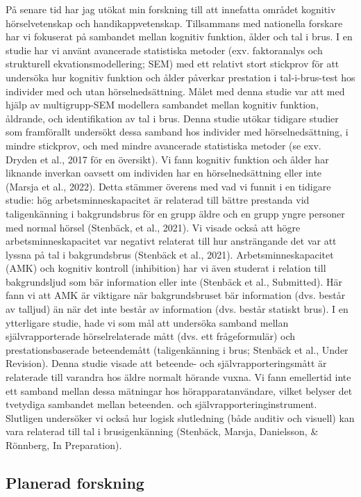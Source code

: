 \documentclass[]{article}
\begin{document}
På senare tid har jag utökat min forskning till att innefatta området
kognitiv hörselvetenskap och handikappvetenskap. Tillsammans med
nationella forskare har vi fokuserat på sambandet mellan kognitiv
funktion, ålder och tal i brus. I en studie har vi använt avancerade
statistiska metoder (exv. faktoranalys och strukturell
ekvationsmodellering; SEM) med ett relativt stort stickprov för att
undersöka hur kognitiv funktion och ålder påverkar prestation i
tal-i-brus-test hos individer med och utan hörselnedsättning. Målet med
denna studie var att med hjälp av multigrupp-SEM modellera sambandet
mellan kognitiv funktion, åldrande, och identifikation av tal i brus.
Denna studie utökar tidigare studier som framförallt undersökt dessa
samband hos individer med hörselnedsättning, i mindre stickprov, och med
mindre avancerade statistiska metoder (se exv. Dryden et al., 2017 för
en översikt). Vi fann kognitiv funktion och ålder har liknande inverkan
oavsett om individen har en hörselnedsättning eller inte (Marsja et al.,
2022). Detta stämmer överens med vad vi funnit i en tidigare studie: hög
arbetsminneskapacitet är relaterad till bättre prestanda vid
taligenkänning i bakgrundsbrus för en grupp äldre och en grupp yngre
personer med normal hörsel (Stenbäck, et al., 2021). Vi visade också att
högre arbetsminneskapacitet var negativt relaterat till hur ansträngande
det var att lyssna på tal i bakgrundsbrus (Stenbäck et al., 2021).
Arbetsminneskapacitet (AMK) och kognitiv kontroll (inhibition) har vi
även studerat i relation till bakgrundsljud som bär information eller
inte (Stenbäck et al., Submitted). Här fann vi att AMK är viktigare när
bakgrundsbruset bär information (dvs. består av talljud) än när det inte
består av information (dvs. består statiskt brus). I en ytterligare
studie, hade vi som mål att undersöka samband mellan självrapporterade
hörselrelaterade mått (dvs. ett frågeformulär) och prestationsbaserade
beteendemått (taligenkänning i brus; Stenbäck et al., Under Revision).
Denna studie visade att beteende- och självrapporteringsmått är
relaterade till varandra hos äldre normalt hörande vuxna. Vi fann
emellertid inte ett samband mellan dessa mätningar hos
hörapparatanvändare, vilket belyser det tvetydiga sambandet mellan
beteenden. och självrapporteringinstrument. Slutligen undersöker vi
också hur logisk slutledning (både auditiv och visuell) kan vara
relaterad till tal i brusigenkänning (Stenbäck, Marsja, Danielsson, \&
Rönnberg, In Preparation).

\hypertarget{planerad-forskning}{%
\subsection{Planerad forskning}\label{planerad-forskning}}
\end{document}
